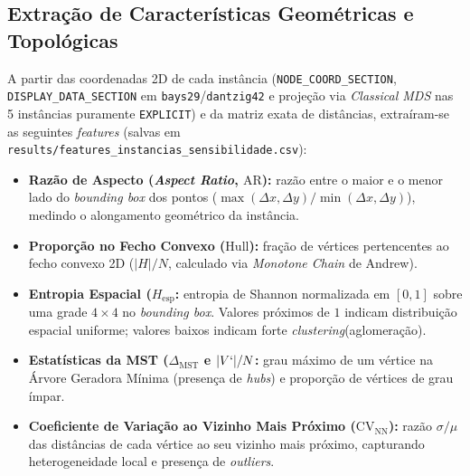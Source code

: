 \documentclass[12pt]{article}
\begin{document}
\subsection{Extração de Características Geométricas e Topológicas}

A partir das coordenadas 2D de cada instância (\texttt{NODE\_COORD\_SECTION}, \texttt{DISPLAY\_DATA\_SECTION} em \texttt{bays29}/\texttt{dantzig42} e projeção via \textit{Classical MDS} nas 5 instâncias puramente \texttt{EXPLICIT}) e da matriz exata de distâncias, extraíram-se as seguintes \textit{features} (salvas em \texttt{results/features\_instancias\_sensibilidade.csv}):

\begin{itemize}
    \item \textbf{Razão de Aspecto (\textit{Aspect Ratio}, $\mathrm{AR}$):} razão entre o maior e o menor lado do \textit{bounding box} dos pontos ($\max(\Delta x, \Delta y) / \min(\Delta x, \Delta y)$), medindo o alongamento geométrico da instância.
    \item \textbf{Proporção no Fecho Convexo ($\mathrm{Hull}$):} fração de vértices pertencentes ao fecho convexo 2D ($|H|/N$, calculado via \textit{Monotone Chain} de Andrew).
    \item \textbf{Entropia Espacial ($H_{\text{esp}}$:} entropia de Shannon normalizada em $[0,1]$ sobre uma grade $4 \times 4$ no \textit{bounding box}. Valores próximos de $1$ indicam distribuição espacial uniforme; valores baixos indicam forte \textit{clustering}(aglomeração).
    \item \textbf{Estatísticas da MST ($\Delta_{\text{MST}}$ e $|V`|/N$:} grau máximo de um vértice na Árvore Geradora Mínima (presença de \textit{hubs}) e proporção de vértices de grau ímpar.
    \item \textbf{Coeficiente de Variação ao Vizinho Mais Próximo ($\mathrm{CV}_{\text{NN}}$):} razão $\sigma/\mu$ das distâncias de cada vértice ao seu vizinho mais próximo, capturando heterogeneidade local e presença de \textit{outliers}.
\end{itemize}
\end{document}
